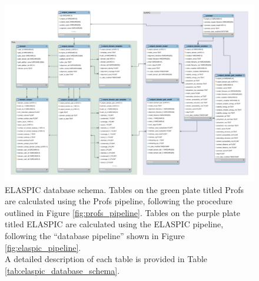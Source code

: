 \begin{figure}[!tb]
	\centering
	\includegraphics[width=1.0\textwidth]{static/elaspic/elaspic_schema.pdf}
	\caption[ELASPIC database schema.]{ELASPIC database schema. Tables on the green plate titled Profs are calculated using the Profs pipeline, following the procedure outlined in Figure \ref{fig:profs_pipeline}. Tables on the purple plate titled ELASPIC are calculated using the ELASPIC pipeline, following the ``database pipeline'' shown in Figure \ref{fig:elaspic_pipeline}. \\
	A detailed description of each table is provided in Table \ref{tab:elaspic_database_schema}.}
    \label{fig:elaspic_database_schema}
\end{figure}


